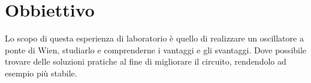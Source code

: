 \section*{Obbiettivo}

Lo scopo di questa esperienza di laboratorio è quello di realizzare un oscillatore a ponte di Wien, studiarlo e comprenderne i vantaggi e gli svantaggi. Dove possibile trovare delle soluzioni pratiche al fine di migliorare il circuito, rendendolo ad esempio più stabile.	
